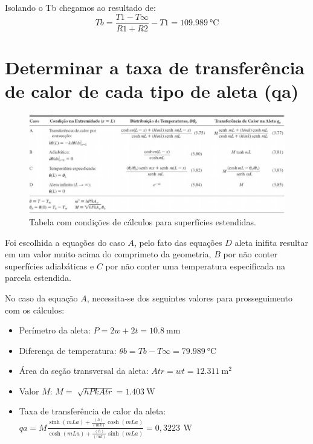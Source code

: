 Isolando o Tb chegamos ao resultado de:
\begin{equation}
    {Tb}={\frac{T1 -T\infty}{{R1}+{R2}}}-{T1} = \SI{109,989}{\degreeCelsius}
\end{equation}

\section{Determinar a taxa de transferência de calor de cada tipo de aleta (qa)}\label{sec:calcTable}

\begin{figure}[h]
    \centering
    \caption{Tabela com condições de cálculos para superfícies estendidas.}
    \label{fig:tabelaCasosCalc}
    \includegraphics[width=15cm]{figuras/tabelaCasosCalc.jpg}
\end{figure}

Foi escolhida a equações do caso \(A\), pelo fato das equações
\(D\) aleta inifita resultar em um valor muito acima do comprimeto da
geometria,
\(B\) por não conter superfícies adiabáticas
e \(C\) por não conter uma temperatura especificada na parcela estendida.
\par No caso da equação \(A\), necessita-se dos seguintes valores
para prosseguimento com os cálculos:
\begin{itemize}[leftmargin=2cm]
    \item Perímetro da aleta: \(
          {P}={2w+2t} = \SI{10,8}{\milli\meter}
          \)
    \item Diferença de temperatura: \(
          {\theta}b={{Tb}-{T\infty}} = \SI{79,989}{\degreeCelsius}
          \)
    \item Área da seção transversal da aleta: \(
          {Atr}={{w}{t}} = \SI{12,311}{\square\meter}
          \)
    \item Valor \(M\): \(
          {M}={\sqrt[]{{h}{P}{k}{Atr}}} = \SI{1,403}{\watt}
          \)
    \item Taxa de transferência
          de calor da aleta: \\\(
          {qa}={M}{
          \frac
          {\sinh{(mLa)}+{\frac{(h)}{(mk)}}{\cosh{(mLa)}}}
          {\cosh{(mLa)}+{\frac{(h)}{(mk)}}{\sinh{(mLa)}}}
          }={0,3223\,\SI{}{\watt}}
          \)
\end{itemize}
